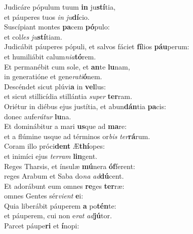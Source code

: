 \evenverse Judicáre pópulum tuum \textbf{in} ju\textbf{stí}tia,~\*\\
\evenverse et páuperes tuos \textit{in} \textit{ju}\textbf{dí}cio.\\
\oddverse Suscípiant montes \textbf{pa}cem \textbf{pó}pulo:~\*\\
\oddverse et col\textit{les} \textit{ju}\textbf{stí}tiam.\\
\evenverse Judicábit páuperes pópuli, et salvos fáciet \textbf{fí}lios \textbf{páu}perum:~\*\\
\evenverse et humiliábit calum\textit{ni}\textit{a}\textbf{tó}rem.\\
\oddverse Et permanébit cum sole, et \textbf{an}te \textbf{lu}nam,~\*\\
\oddverse in generatióne et gene\textit{ra}\textit{ti}\textbf{ó}nem.\\
\evenverse Descéndet sicut plúvi\textbf{a} in \textbf{vel}lus:~\*\\
\evenverse et sicut stillicídia stillántia \textit{su}\textit{per} \textbf{ter}ram.\\
\oddverse Oriétur in diébus ejus justítia, et abun\textbf{dán}tia \textbf{pa}cis:~\*\\
\oddverse donec aufe\textit{rá}\textit{tur} \textbf{lu}na.\\
\evenverse Et dominábitur a mari \textbf{us}que ad \textbf{ma}re:~\*\\
\evenverse et a flúmine usque ad términos or\textit{bis} \textit{ter}\textbf{rá}rum.\\
\oddverse Coram illo próci\textbf{dent} Æ\textbf{thí}opes:~\*\\
\oddverse et inimíci ejus \textit{ter}\textit{ram} \textbf{lin}gent.\\
\evenverse Reges Tharsis, et ínsulæ \textbf{mú}nera \textbf{óf}ferent:~\*\\
\evenverse reges Arabum et Saba do\textit{na} \textit{ad}\textbf{dú}cent.\\
\oddverse Et adorábunt eum omnes \textbf{re}ges \textbf{ter}ræ:~\*\\
\oddverse omnes Gentes sér\textit{vi}\textit{ent} \textbf{e}i:\\
\evenverse Quia liberábit páuperem \textbf{a} po\textbf{tén}te:~\*\\
\evenverse et páuperem, cui non e\textit{rat} \textit{ad}\textbf{jú}tor.\\
\oddverse Parcet páupe\textbf{ri} et \textbf{í}nopi:~\*\\
